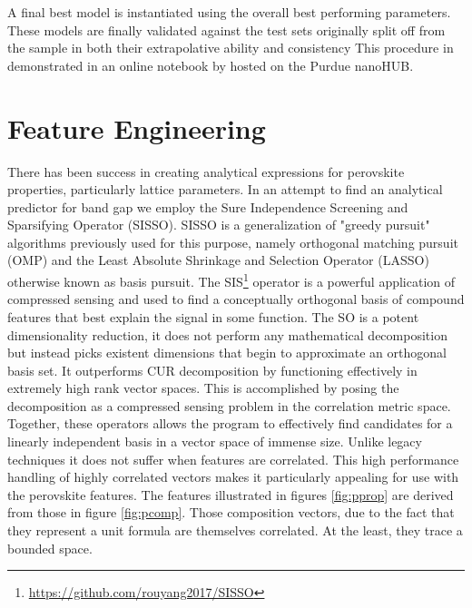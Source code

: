 A final best model is instantiated using the overall best performing parameters.
These models are finally validated against the test sets originally split off from the sample in both their extrapolative ability and consistency 
This procedure in demonstrated in an online notebook by \textcite{manganaris-2022-mrs-comput} hosted on the Purdue nanoHUB.

\section{Feature Engineering}
\label{sec:orgeb8814f}
There has been success in creating analytical expressions for perovskite properties, particularly lattice parameters.
\autocite{jiang-2006-predic-lattic}
In an attempt to find an analytical predictor for band gap we employ the Sure Independence Screening and Sparsifying Operator (SISSO).
\autocite{ouyang-2018-sisso} 
SISSO is a generalization of "greedy pursuit" algorithms previously used for this purpose, namely orthogonal matching pursuit (OMP) and the Least Absolute Shrinkage and Selection Operator (LASSO) otherwise known as basis pursuit.
\autocite{tibshirani-1996-regres-shrin}
The SIS\footnote{\url{https://github.com/rouyang2017/SISSO}} operator is a powerful application of compressed sensing and used to find a conceptually orthogonal basis of compound features that best explain the signal in some function.
\autocite{ghiringhelli-2017-learn-physic}
The SO is a potent dimensionality reduction, it does not perform any mathematical decomposition but instead picks existent dimensions that begin to approximate an orthogonal basis set.
It outperforms CUR decomposition by functioning effectively in extremely high rank vector spaces.
\autocite{ray-2021-various-dimen,hamm-2019-cur-decom}
This is accomplished by posing the decomposition as a compressed sensing problem in the correlation metric space.
Together, these operators allows the program to effectively find candidates for a linearly independent basis in a vector space of immense size.
Unlike legacy techniques it does not suffer when features are correlated.
\autocite{tibshirani-1996-regres-shrin,gauraha-2018-introd-to-lasso}
This high performance handling of highly correlated vectors makes it particularly appealing for use with the perovskite features.
The features illustrated in figures \ref{fig:pprop} are derived from those in figure \ref{fig:pcomp}.
Those composition vectors, due to the fact that they represent a unit formula are themselves correlated.
At the least, they trace a bounded space.

